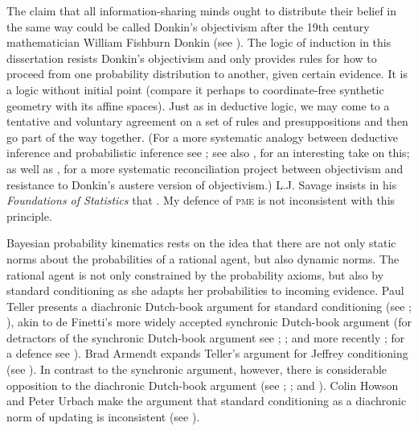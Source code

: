 \documentclass[phd,12pt,oneside]{ubcthesis}
\begin{document}
The claim that all information-sharing minds ought to distribute their
belief in the same way could be called Donkin's objectivism after the
19th century mathematician William Fishburn Donkin (see
). The logic of induction in this dissertation
resists Donkin's objectivism and only provides rules for how to
proceed from one probability distribution to another, given certain
evidence. It is a logic without initial point (compare it perhaps to
coordinate-free synthetic geometry with its affine spaces). Just as in
deductive logic, we may come to a tentative and voluntary agreement on
a set of rules and presuppositions and then go part of the way
together. (For a more systematic analogy between deductive inference
and probabilistic inference see ; see also
, for an interesting take on this; as well as
, for a more systematic reconciliation project
between objectivism and resistance to Donkin's austere version of
objectivism.) L.J. Savage insists in his \emph{Foundations of
  Statistics} that 
. My defence of \textsc{pme} is not
inconsistent with this principle.


Bayesian probability kinematics rests on the idea that there are not
only static norms about the probabilities of a rational agent, but
also dynamic norms. The rational agent is not only constrained by the
probability axioms, but also by standard conditioning as she adapts
her probabilities to incoming evidence. Paul Teller presents a
diachronic Dutch-book argument for standard conditioning (see
; ), akin to de Finetti's
more widely accepted synchronic Dutch-book argument (for detractors of
the synchronic Dutch-book argument see ;
; and more recently
; for a defence see ).
Brad Armendt expands Teller's argument for Jeffrey conditioning (see
). In contrast to the synchronic argument,
however, there is considerable opposition to the diachronic Dutch-book
argument (see ; ; and
). Colin Howson and Peter Urbach make the argument
that standard conditioning as a diachronic norm of updating is
inconsistent (see ).
\end{document}
